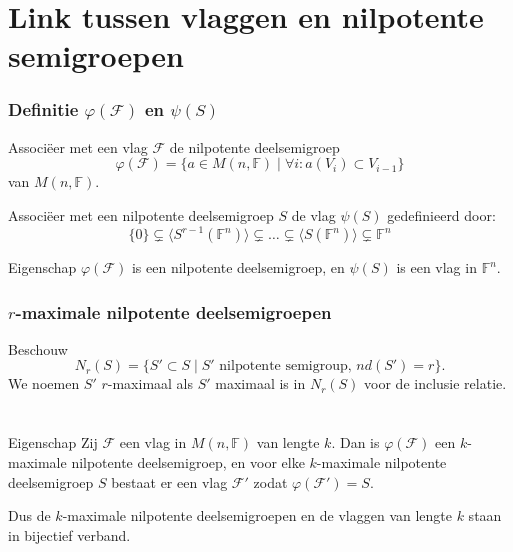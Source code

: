 \documentclass[12pt]{beamer}
\newcommand{\F}{\mathbb{F}}
\begin{document}
\section{Link tussen vlaggen en nilpotente semigroepen}

\begin{frame}
\frametitle{Definitie $\varphi(\mathcal{F})$ en $\psi(S)$}

\begin{block}{}
Associ\"eer met een vlag $\mathcal{F}$ de nilpotente deelsemigroep
$$\varphi (\mathcal{F}) = \{ a \in M(n,\F) \; | \; \forall i :  a(V_i) \subset V_{i-1} \}$$
van $M(n,\F)$.
\end{block}

\begin{block}{}
Associ\"eer met een nilpotente deelsemigroep $S$ de vlag $\psi (S) $ gedefinieerd door:
$$ \{0 \} \subsetneq \langle S^{r-1} (\F^n) \rangle \subsetneq \dots \subsetneq \langle S(\F^n)\rangle \subsetneq \F^n$$
\end{block}

\begin{block}{Eigenschap}
$\varphi(\mathcal{F})$ is een nilpotente deelsemigroep, en $\psi(S)$ is een vlag in $\F^n$.
\end{block}


\end{frame}


\begin{frame}
\frametitle{$r$-maximale nilpotente deelsemigroepen}

\begin{block}{}
Beschouw
$$N_r(S) = \{ S' \subset S \; | \; S' \text{ nilpotente semigroup, } nd(S') = r\}.$$
We noemen $S'$ $r$-maximaal als $S'$ maximaal is in $N_r(S)$ voor de inclusie relatie. 
\end{block}

\end{frame}


\begin{frame}
\frametitle{ $ $ }

\begin{block}{Eigenschap}
Zij $\mathcal{F}$ een vlag in $M(n,\F)$ van lengte $k$. Dan is $\varphi (\mathcal{F})$ een $k$-maximale nilpotente deelsemigroep, en voor elke $k$-maximale nilpotente deelsemigroep $S$ bestaat er een vlag $\mathcal{F'}$ zodat $\varphi (\mathcal{F}') = S$.
\end{block}

\begin{block}{}
Dus de $k$-maximale nilpotente deelsemigroepen en de vlaggen van lengte $k$ staan in bijectief verband.
\end{block}

\end{frame}
\end{document}
